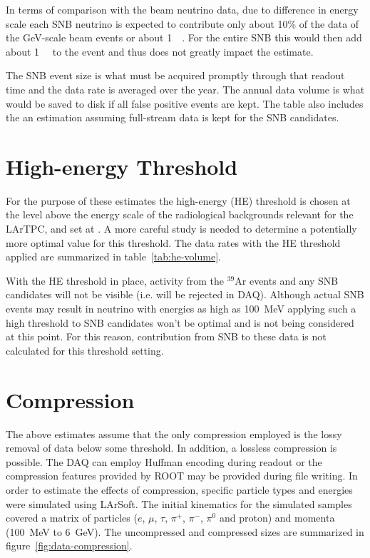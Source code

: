 In terms of comparison with the beam neutrino data, 
due to difference in energy scale each SNB neutrino is expected to contribute only
about 10\% of the data of the
\si{\GeV}-scale beam events or about \SI{1}{\mega\byte}.
For the entire SNB this would then add about \SI{1}{\giga\byte} to the
event and thus does not greatly impact the estimate.

The SNB event size is what must be acquired promptly through that
readout time and the data rate is averaged over the year.
The annual data volume is what would be saved to disk if all false
positive events are kept.
The table also includes the an estimation assuming full-stream data is
kept for the SNB candidates.

\section{High-energy Threshold}

For the purpose of these estimates the  high-energy (HE) threshold is chosen at the level above 
the energy scale of the radiological backgrounds relevant for the LArTPC, and set at  \chargehethreshold.
A more careful study is needed to determine a potentially more optimal value for this threshold.
The data rates with the HE threshold applied are summarized in table~\ref{tab:he-volume}.



With the HE threshold in place, activity from the $^{39}$Ar events and any SNB
candidates will not be visible (i.e. will be rejected in DAQ).
Although actual SNB events may result in neutrino with energies as high as
\SI{100}{\MeV} applying such a high threshold to SNB candidates won't be optimal and is not being considered at this point.
For this reason, contribution from SNB to these data is not calculated for this threshold setting.


\section{Compression}

The above estimates assume that the only compression employed is the
lossy removal of data below some threshold.
In addition, a lossless compression is possible.
The DAQ can employ Huffman encoding during readout or the compression
features provided by ROOT may be provided during file writing.
In order to estimate the effects of compression, specific particle
types and energies were simulated using LArSoft.
The initial kinematics for the simulated samples covered a matrix of
particles ($e$, $\mu$, $\tau$, $\pi^+$, $\pi^-$, $\pi^0$ and proton) and momenta
(\SI{100}{\MeV} to \SI{6}{\GeV}).
The uncompressed and compressed sizes are summarized in figure~\ref{fig:data-compression}.

